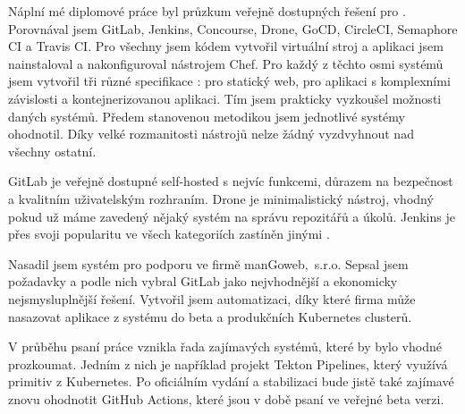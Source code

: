 \label{Závěr}
    Náplní mé diplomové práce byl průzkum veřejně dostupných řešení pro \CICD. Porovnával jsem GitLab, Jenkins, Concourse, Drone, GoCD, CircleCI, Semaphore CI a Travis CI. Pro všechny jsem kódem vytvořil virtuální stroj a aplikaci jsem nainstaloval a nakonfiguroval nástrojem Chef. Pro každý z těchto osmi systémů jsem vytvořil tři různé specifikace \CI: pro statický web, pro aplikaci s komplexními závislosti a kontejnerizovanou aplikaci. Tím jsem prakticky vyzkoušel možnosti daných systémů. Předem stanovenou metodikou jsem jednotlivé systémy ohodnotil. Díky velké rozmanitosti nástrojů nelze žádný vyzdvyhnout nad všechny ostatní.

    GitLab je veřejně dostupné self-hosted \CI s nejvíc funkcemi, důrazem na bezpečnost a kvalitním uživatelským rozhraním. Drone je minimalistický nástroj, vhodný pokud už máme zavedený nějaký systém na správu repozitářů a úkolů. Jenkins je přes svoji popularitu ve všech kategoriích zastíněn jinými \CICD.

    Nasadil jsem systém pro podporu \CICD ve firmě manGoweb,~s.r.o. Sepsal jsem požadavky a podle nich vybral GitLab jako nejvhodnější a ekonomicky nejsmysluplnější řešení. Vytvořil jsem automatizaci, díky které firma může nasazovat aplikace z \CI systému do beta a produkčních Kubernetes clusterů.

    V průběhu psaní práce vznikla řada zajímavých \CICD systémů, které by bylo vhodné prozkoumat. Jedním z nich je například projekt Tekton Pipelines, který využívá primitiv z Kubernetes. Po oficiálním vydání a stabilizaci bude jistě také zajímavé znovu ohodnotit GitHub Actions, které jsou v době psaní ve veřejné beta verzi.
